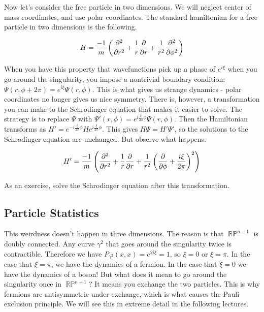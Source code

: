 \documentclass{article}
\DeclareMathOperator{\RP}{\mathbb{RP}}
\begin{document}
Now let's consider the free particle in two dimensions. We will neglect center of mass coordinates, and use polar coordinates. The standard hamiltonian for a free particle in two dimensions is the following.

\begin{equation}
H = \frac{-1}{m}\left(\pdv[2]{r}+\frac{1}{r}\pdv{r}+ \frac{1}{r^2}\pdv[2]{\phi}\right)
\end{equation}

When you have this property that wavefunctions pick up a phase of $e^{i\xi}$ when you go around the singularity, you impose a nontrivial boundary condition: $\Psi(r,\phi+2\pi) = e^{i\xi}\Psi(r,\phi)$. This is what gives us strange dynamics - polar coordinates no longer gives us nice symmetry. There is, however, a transformation you can make to the Schrodinger equation that makes it easier to solve. The strategy is to replace $\Psi$ with $\Psi'(r,\phi) = e^{i\frac{\xi}{2\pi}\phi}\Psi(r,\phi)$. Then the Hamiltonian transforms as $H' = e^{-i\frac{\xi}{2\pi}\phi}H e^{i\frac{\xi}{2\pi}\phi}$. This gives $H\Psi = H'\Psi'$, so the solutions to the Schrodinger equation are unchanged. But observe what happens:

\begin{equation}
H' = \frac{-1}{m}\left(\pdv[2]{r}+\frac{1}{r}\pdv{r}+ \frac{1}{r^2}\left(\pdv{\phi}+\frac{i\xi}{2\pi}\right)^2\right)
\end{equation}

As an exercise, solve the Schrodinger equation after this transformation.

\subsection{Particle Statistics}

This weirdness doesn't happen in three dimensions. The reason is that $\RP^{n-1}$ is doubly connected. Any curve $\gamma^2$ that goes around the singularity twice is contractible. Therefore we have $P_{\gamma^2}(x,x) = e^{2i\xi}=1$, so $\xi = 0$ or $\xi = \pi$. In the case that $\xi = \pi$, we have the dynamics of a fermion. In the case that $\xi = 0$ we have the dynamics of a boson! But what does it mean to go around the singularity once in $\RP^{n-1}$? It means you exchange the two particles. This is why fermions are antisymmetric under exchange, which is what causes the Pauli exclusion principle. We will see this in extreme detail in the following lectures.
\end{document}
